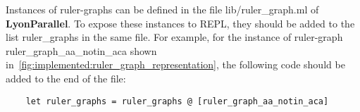 Instances of ruler-graphs can be defined in the file \colorbox{Ivory2}{lib/ruler\_graph.ml} of \textbf{LyonParallel}. To expose these instances to REPL, they should be added to the list \colorbox{Ivory2}{ruler\_graphs} in the same file. For example, for the instance of ruler-graph \colorbox{Ivory2}{ruler\_graph\_aa\_notin\_aca} shown in~\autoref{fig:implemented:ruler_graph_representation}, the following code should be added to the end of the file:
\begin{verbatim}
    let ruler_graphs = ruler_graphs @ [ruler_graph_aa_notin_aca] 
\end{verbatim}




